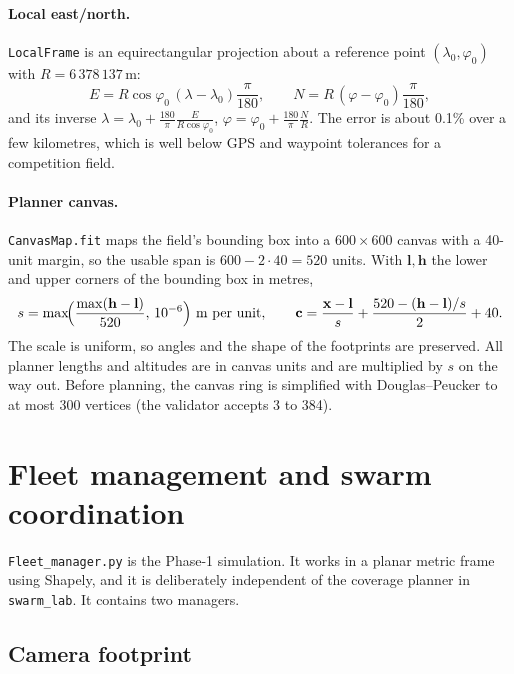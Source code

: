 \documentclass[11pt,a4paper]{article}
\newcommand{\code}[1]{\texttt{#1}}
\begin{document}
\paragraph{Local east/north.} \code{LocalFrame} is an equirectangular projection about a reference point
$(\lambda_0,\varphi_0)$ with $R = 6\,378\,137$\,m:
\begin{equation}
E = R\cos\varphi_0\,(\lambda-\lambda_0)\frac{\pi}{180},\qquad
N = R\,(\varphi-\varphi_0)\frac{\pi}{180},
\label{eq:enu}
\end{equation}
and its inverse $\lambda = \lambda_0 + \frac{180}{\pi}\frac{E}{R\cos\varphi_0}$,
$\varphi = \varphi_0 + \frac{180}{\pi}\frac{N}{R}$. The error is about 0.1\% over a few kilometres, which
is well below GPS and waypoint tolerances for a competition field.

\paragraph{Planner canvas.} \code{CanvasMap.fit} maps the field's bounding box into a $600\times600$ canvas
with a 40-unit margin, so the usable span is $600-2\cdot40=520$ units. With $\mathbf{l},\mathbf{h}$ the
lower and upper corners of the bounding box in metres,
\begin{equation}
s = \max\!\Bigl(\frac{\max(\mathbf{h}-\mathbf{l})}{520},\,10^{-6}\Bigr)\ \text{m per unit},\qquad
\mathbf{c} = \frac{\mathbf{x}-\mathbf{l}}{s} + \frac{520 - (\mathbf{h}-\mathbf{l})/s}{2} + 40 .
\label{eq:canvas}
\end{equation}
The scale is uniform, so angles and the shape of the footprints are preserved. All planner lengths and
altitudes are in canvas units and are multiplied by $s$ on the way out. Before planning, the canvas ring is
simplified with Douglas--Peucker to at most 300 vertices (the validator accepts 3 to 384).

\section{Fleet management and swarm coordination}
\label{sec:fleet}

\code{Fleet\_manager.py} is the Phase-1 simulation. It works in a planar metric frame using Shapely, and it
is deliberately independent of the coverage planner in \code{swarm\_lab}. It contains two managers.

\subsection{Camera footprint}
\end{document}

